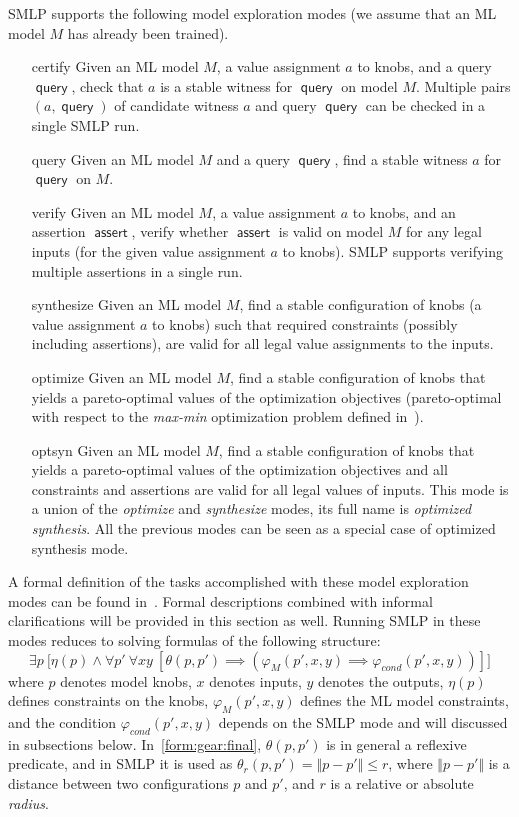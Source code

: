 \documentclass[a4paper,parskip=half]{article} %
\newcommand*\eqdef=
\newcommand*\query{\operatorname{\mathsf{query}}}
\newcommand*\assert{\operatorname{\mathsf{assert}}}
\begin{document}
SMLP supports the following model exploration modes (we assume that an ML model $M$ has already been trained). 
\begin{itemize}
\item[certify] Given an ML model $M$, a value assignment $a$ to knobs, and a query $\query$, check that $a$ is a stable 
witness for $\query$ on model $M$. Multiple pairs $(a,\query)$ of candidate witness $a$ and query $\query$ can be checked in a single SMLP run.
\item[query] Given an ML model $M$  and a query $\query$, find a stable witness $a$  for $\query$ on $M$.
\item[verify] Given an ML model $M$,  a value assignment $a$ to knobs,  and an assertion $\assert$, verify whether  
$\assert$ is valid on model $M$ for any legal inputs (for the given value assignment $a$ to knobs). SMLP supports verifying 
multiple assertions in a single run.
\item[synthesize] Given an ML model $M$,  find a stable configuration of knobs (a value assignment $a$ to knobs) 
such that required constraints (possibly including assertions),  are valid for all legal value assignments to the inputs.
\item[optimize]  Given an ML model $M$,  find a stable configuration of knobs that yields a pareto-optimal values of 
the optimization objectives (pareto-optimal with respect to the \emph{max-min} optimization problem defined in~\cite{BKK24}).
\item[optsyn] Given an ML model $M$,  find a stable configuration of knobs that yields a pareto-optimal values of the 
optimization objectives and all constraints and assertions are valid for all legal values of inputs. This mode is a union 
of the \emph{optimize} and \emph{synthesize} modes, its full name is \emph{optimized synthesis}. 
All the previous modes can be seen as a special case of optimized synthesis mode.
\end{itemize}

A formal definition of the tasks accomplished with these model exploration modes can be found in~\cite{BKK24}. 
Formal descriptions combined with informal clarifications will be provided in this section as well. 
Running SMLP in these modes reduces to solving formulas of the following structure:
\begin{equation}\label{form:gear:final}
    \exists p ~\big[ \eta(p) \wedge
    \forall p'~
    \forall x y~[
    \theta(p,p') \implies (\varphi_M(p',x,y)  \implies  \varphi_{\mathit{cond}}(p',x,y))
    ]\big]
\end{equation}
where $p$ denotes model knobs, $x$ denotes inputs, $y$ denotes the outputs, $\eta(p)$ defines 
constraints on the knobs,  $\varphi_M(p',x,y)$ defines the ML model constraints, and the 
condition $\varphi_{\mathit{cond}}(p',x,y)$ depends on the SMLP mode and will discussed in subsections below.
In~\cref{form:gear:final}, $\theta(p,p')$ is in general a reflexive predicate, and in SMLP it is used as 
$\theta_r(p, p') \eqdef \Vert p - p' \Vert \leq r$, where  $\Vert p - p' \Vert$ is a distance between 
two configurations $p$ and $p'$, and $r$ is a relative or absolute \emph{radius}.
\end{document}
